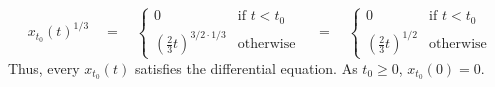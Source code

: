 \documentclass[12pt]{article}
\begin{document}
$$x_{t_0}(t)^{1/3}
\quad = \quad
\begin{cases}
0 & \text{if $t < t_0$}\\
\left(\frac{2}{3}t\right)^{3/2 \cdot 1/3} & \text{otherwise}
\end{cases}
\quad = \quad
\begin{cases}
0 & \text{if $t < t_0$}\\
\left(\frac{2}{3}t\right)^{1/2} & \text{otherwise}
\end{cases}$$
Thus, every $x_{t_0}(t)$ satisfies the differential equation. As $t_0 \ge 0$, $x_{t_0}(0) = 0$.
\end{document}
